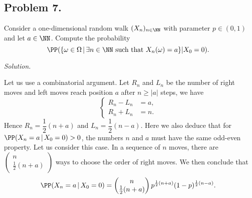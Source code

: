 \subsection*{Problem 7.} Consider a one-dimensional random walk $(X_n)_{n\in\NN}$ with parameter $p\in(0, 1)$ and let $a\in\NN$. Compute the probability 
$$\PP (\{\omega\in\Omega \,|\, \exists n\in\NN \text{ such that } X_n(\omega) = a\}|X_0 = 0).$$

\textit{Solution.}

Let us use a combinatorial argument. Let $R_n$ and $L_n$ be the number of right moves and left moves reach position $a$ after $n \ge |a|$ steps, we have
$$\begin{cases}
    R_n - L_n &= a,\\
    R_n + L_n &= n.
\end{cases}$$
Hence $R_n = \dfrac{1}{2}(n+a)$ and $L_n = \dfrac{1}{2}(n-a)$. Here we also deduce that for $\PP(X_n = a\,|\, X_0 = 0)> 0$, the numbers $n$ and $a$ must have the same odd-even property. Let us consider this case. In a sequence of $n$ moves, there are $\begin{pmatrix}
    n \\ \frac{1}{2}(n+a)
\end{pmatrix}$ ways to choose the order of right moves. We then conclude that
$$\PP(X_n = a\,|\, X_0 = 0) = \begin{pmatrix}
    n \\ \frac{1}{2}(n+a)
\end{pmatrix}p^{\frac{1}{2}(n+a)}(1-p)^{\frac{1}{2}(n-a)}.$$
